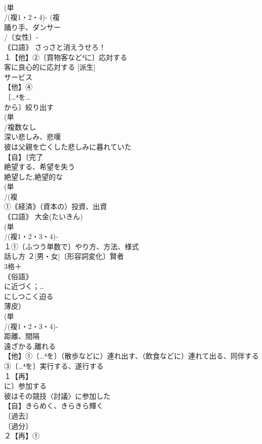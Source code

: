 \documentclass[8pt]{extreport}
\begin{document}
\begin{CJK}{UTF8}{min}
\\	(単
\\	/(複1・2・4)- (複
\\	踊り手、ダンサー 
\\	/〔女性〕-
\\	｟口語｠ さっさと消えうせろ！
\\	１【他】②〔買物客など⁴に〕応対する 
\\	客に良心的に応対する [派生] 
\\	サービス
\\	【他】④
\\	〔…⁴を…
\\	から〕絞り出す 
\\	(単
\\	/複数なし 
\\	深い悲しみ、悲嘆 
\\	彼は父親を亡くした悲しみに暮れていた
\\	【自】〔完了
\\	絶望する、希望を失う 
\\	絶望した,絶望的な
\\	(単
\\	/(複
\\	①｟経済｠（資本の）投資、出資
\\	｟口語｠ 大金(たいきん)
\\	(単
\\	/(複1・2・3・4)‐
\\	１①〔ふつう単数で〕やり方、方法、様式 
\\	話し方 ２[男・女]〔形容詞変化〕賢者
\\	3格＋
\\	｟俗語｠ 
\\	に近づく；…
\\	にしつこく迫る 
\\	薄皮）
\\	(単
\\	/(複1・2・3・4)‐
\\	距離、間隔 
\\	遠ざかる,離れる
\\	【他】①〔…⁴を〕（散歩などに）連れ出す、（飲食などに）連れて出る、同伴する ③〔…⁴を〕実行する、遂行する
\\	１【再】
\\	に〕参加する 
\\	彼はその競技〈討議〉に参加した 
\\	【自】きらめく、きらきら輝く 
\\	〔過去〕
\\	〔過分〕
\\	２【再】①

\end{CJK}
\end{document}
